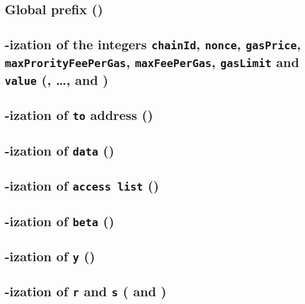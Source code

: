 \subsection{Global \rlp{} prefix (\phaseRlpPrefix)}                                         
\subsection{\rlp-ization of the integers \texttt{chainId}, \texttt{nonce}, \texttt{gasPrice}, \texttt{maxProrityFeePerGas}, \texttt{maxFeePerGas}, \texttt{gasLimit} and \texttt{value} (\phaseChainId{}, \dots, \phaseGasLimit{} and \phaseValue{})}
                                                                                            
\subsection{\rlp-ization of \texttt{to} address (\phaseTo)}                                     
\subsection{\rlp-ization of \texttt{data} (\phaseData)}                                     
\subsection{\rlp-ization of \texttt{access list} (\phaseAccessList)}                        
\subsection{\rlp-ization of \texttt{beta} (\phaseBeta)}                                     
\subsection{\rlp-ization of \texttt{y} (\phaseY)}                                           
\subsection{\rlp-ization of \texttt{r} and \texttt{s} (\phaseR{} and \phaseS)}              
